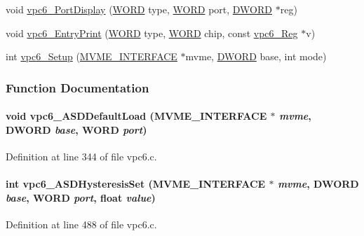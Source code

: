 \begin{DoxyCompactItemize}
\item 
void \hyperlink{vpc6_8c_a30c15080312a5dbb3bfb9bc4e1b21202}{vpc6\_\-PortDisplay} (\hyperlink{vt2_8h_a2b0e863dadf920709ec53d9088ee7c91}{WORD} type, \hyperlink{vt2_8h_a2b0e863dadf920709ec53d9088ee7c91}{WORD} port, \hyperlink{vt2_8h_a798af1e30bc65f319c1a246cecf59e39}{DWORD} $\ast$reg)
\item 
void \hyperlink{vpc6_8c_acba11652b38f9148081dc825bb79ccd5}{vpc6\_\-EntryPrint} (\hyperlink{vt2_8h_a2b0e863dadf920709ec53d9088ee7c91}{WORD} type, \hyperlink{vt2_8h_a2b0e863dadf920709ec53d9088ee7c91}{WORD} chip, const \hyperlink{unionvpc6__Reg}{vpc6\_\-Reg} $\ast$v)
\item 
int \hyperlink{vpc6_8c_a0bf11be8a7c2d0971e5c2bfb1387e36b}{vpc6\_\-Setup} (\hyperlink{structMVME__INTERFACE}{MVME\_\-INTERFACE} $\ast$mvme, \hyperlink{vt2_8h_a798af1e30bc65f319c1a246cecf59e39}{DWORD} base, int mode)
\end{DoxyCompactItemize}


\subsubsection{Function Documentation}
\paragraph[{vpc6\_\-ASDDefaultLoad}]{\setlength{\rightskip}{0pt plus 5cm}void vpc6\_\-ASDDefaultLoad ({\bf MVME\_\-INTERFACE} $\ast$ {\em mvme}, \/  {\bf DWORD} {\em base}, \/  {\bf WORD} {\em port})}\hfill\label{vpc6_8c_a94c50f949c0ea364b353ec0500168839}


Definition at line 344 of file vpc6.c.
\paragraph[{vpc6\_\-ASDHysteresisSet}]{\setlength{\rightskip}{0pt plus 5cm}int vpc6\_\-ASDHysteresisSet ({\bf MVME\_\-INTERFACE} $\ast$ {\em mvme}, \/  {\bf DWORD} {\em base}, \/  {\bf WORD} {\em port}, \/  float {\em value})}\hfill\label{vpc6_8c_a664bb195d66757bbfd4d64425ce6b501}


Definition at line 488 of file vpc6.c.

